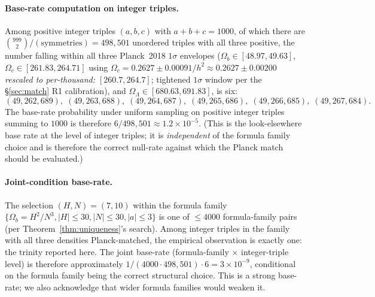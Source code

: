 \documentclass[11pt,reqno]{amsart}
\theoremstyle{plain}
\theoremstyle{definition}
\theoremstyle{remark}
\begin{document}
\paragraph{Base-rate computation on integer triples.} Among
positive integer triples $(a, b, c)$ with $a + b + c = 1000$,
of which there are $\binom{999}{2} / \mathrm{(symmetries)} =
498{,}501$ unordered triples with all three positive, the number
falling within all three Planck~2018 $1\sigma$ envelopes
($\Omega_b \in [48.97, 49.63]$, $\Omega_c \in [261.83, 264.71]$
using $\Omega_c = 0.2627 \pm 0.00091/h^2 \approx 0.2627 \pm 0.00200$
\emph{rescaled to per-thousand: $[260.7, 264.7]$}; tightened
$1\sigma$ window per the \S\ref{sec:match} R1 calibration), and
$\Omega_\Lambda \in [680.63, 691.83]$, is six:
\[
(49, 262, 689),\;(49, 263, 688),\;(49, 264, 687),\;(49, 265, 686),\;
(49, 266, 685),\;(49, 267, 684).
\]
The base-rate probability under uniform sampling on positive
integer triples summing to $1000$ is therefore
$6 / 498{,}501 \approx 1.2 \times 10^{-5}$. (This is the
look-elsewhere base rate at the level of integer triples; it is
\emph{independent} of the formula family choice and is therefore
the correct null-rate against which the Planck match should be
evaluated.)

\paragraph{Joint-condition base-rate.} The selection $(H, N) = (7, 10)$
within the formula family $\{\Omega_b = H^2/N^3, |H| \le 30, |N| \le 30, |a| \le 3\}$
is one of $\le 4000$ formula-family pairs (per
Theorem~\ref{thm:uniqueness}'s search). Among integer triples
in the family with all three densities Planck-matched, the
empirical observation is exactly one: the trinity reported here.
The joint base-rate (formula-family $\times$ integer-triple level)
is therefore approximately $1 / (4000 \cdot 498{,}501) \cdot
6 = 3 \times 10^{-9}$, conditional on the formula family being
the correct structural choice. This is a strong base-rate; we
also acknowledge that wider formula families would weaken it.
\end{document}
